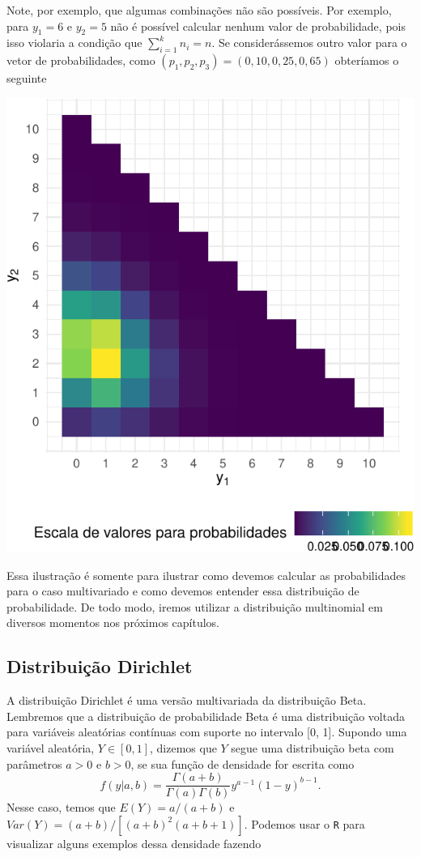 \documentclass[]{book}
\begin{document}
Note, por exemplo, que algumas combinações não são possíveis. Por exemplo, para \(y_1 = 6\) e \(y_2 = 5\) não é possível calcular nenhum valor de probabilidade, pois isso violaria a condição que \(\sum_{i=1}^k n_i = n\). Se considerássemos outro valor para o vetor de probabilidades, como \((p_1, p_2, p_3) = (0,10, 0,25, 0,65)\) obteríamos o seguinte

\begin{center}\includegraphics[width=0.8\linewidth]{notas_livro_files/figure-latex/graf13-1} \end{center}

Essa ilustração é somente para ilustrar como devemos calcular as probabilidades para o caso multivariado e como devemos entender essa distribuição de probabilidade. De todo modo, iremos utilizar a distribuição multinomial em diversos momentos nos próximos capítulos.

\hypertarget{distribuicao-dirichlet}{%
\subsection{Distribuição Dirichlet}\label{distribuicao-dirichlet}}

A distribuição Dirichlet é uma versão multivariada da distribuição Beta. Lembremos que a distribuição de probabilidade Beta é uma distribuição voltada para variáveis aleatórias contínuas com suporte no intervalo {[}0, 1{]}. Supondo uma variável aleatória, \(Y \in [0, 1]\), dizemos que \(Y\) segue uma distribuição beta com parâmetros \(a > 0\) e \(b > 0\), se sua função de densidade for escrita como
\[
f(y | a, b) = \frac{\Gamma(a+b)}{\Gamma(a)\Gamma(b)} y^{a-1}(1-y)^{b-1}.
\]
Nesse caso, temos que \(E(Y) = a/(a+b)\) e \(Var(Y) = (a+b)/[(a+b)^2(a+b+1)]\). Podemos usar o \texttt{R} para visualizar alguns exemplos dessa densidade fazendo
\end{document}
